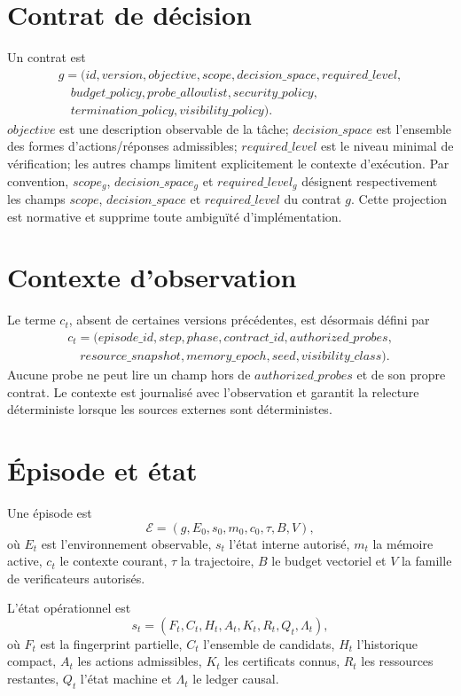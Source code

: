 \documentclass[11pt,a4paper]{report}
\begin{document}
\section{Contrat de décision}
Un contrat est
\[
\begin{aligned}
g=(id,version,objective,scope,decision\_space,required\_level,\\
\quad budget\_policy,probe\_allowlist,security\_policy,\\
\quad termination\_policy,visibility\_policy).
\end{aligned}
\]
$objective$ est une description observable de la tâche; $decision\_space$ est l'ensemble des formes d'actions/réponses admissibles; $required\_level$ est le niveau minimal de vérification; les autres champs limitent explicitement le contexte d'exécution.
Par convention, $scope_g$, $decision\_space_g$ et $required\_level_g$ désignent respectivement les champs $scope$, $decision\_space$ et $required\_level$ du contrat $g$. Cette projection est normative et supprime toute ambiguïté d'implémentation.

\section{Contexte d'observation}
Le terme $c_t$, absent de certaines versions précédentes, est désormais défini par
\[
\begin{aligned}
c_t=(episode\_id,step,phase,contract\_id,authorized\_probes,\\
\quad resource\_snapshot,memory\_epoch,seed,visibility\_class).
\end{aligned}
\]
Aucune probe ne peut lire un champ hors de $authorized\_probes$ et de son propre contrat. Le contexte est journalisé avec l'observation et garantit la relecture déterministe lorsque les sources externes sont déterministes.

\section{Épisode et état}
Une épisode est
\[
\mathcal E=(g,E_0,s_0,m_0,c_0,\tau,B,V),
\]
où $E_t$ est l'environnement observable, $s_t$ l'état interne autorisé, $m_t$ la mémoire active, $c_t$ le contexte courant, $\tau$ la trajectoire, $B$ le budget vectoriel et $V$ la famille de verificateurs autorisés.

L'état opérationnel est
\[
s_t=(F_t,C_t,H_t,A_t,K_t,R_t,Q_t,\Lambda_t),
\]
où $F_t$ est la fingerprint partielle, $C_t$ l'ensemble de candidats, $H_t$ l'historique compact, $A_t$ les actions admissibles, $K_t$ les certificats connus, $R_t$ les ressources restantes, $Q_t$ l'état machine et $\Lambda_t$ le ledger causal.
\end{document}
